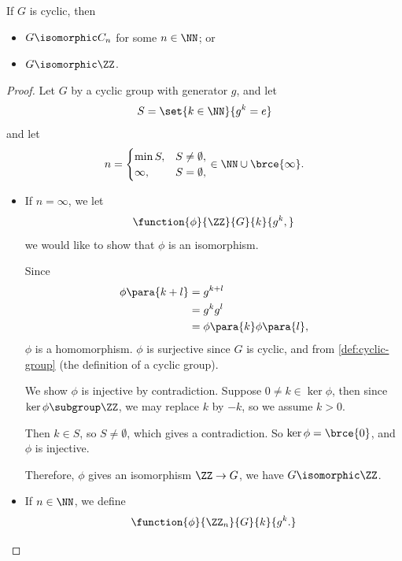 \begin{theorem}
    \label{thm:classification-cyclic-groups}%
    If \(G\) is cyclic, then
    \begin{itemize}
        \item \(G \isomorphic C_n\) for some \(n \in \NN\); or
        \item \(G \isomorphic \ZZ\).
    \end{itemize}
\end{theorem}

\begin{proof}
    Let \(G\) by a cyclic group with generator \(g\), and let
    \[
        S = \set{k \in \NN}{g^k = e}
    \]
    and let
    \[
        n = \begin{cases}
            \min S, & S \neq \emptyset, \\
            \infty, & S = \emptyset,
        \end{cases}
        \in \NN \cup \brce{\infty}.
    \]

    \begin{itemize}
        \item If \(n = \infty\), we let
        \[
            \function{\phi}{\ZZ}{G}{k}{g^k,}
        \]
        we would like to show that \(\phi\) is an isomorphism.

        Since
        \begin{align*}
            \phi \para{k + l} &= g^{k + l} \\
            &= g^k g^l \\
            &= \phi \para{k} \phi \para{l},
        \end{align*}
        \(\phi\) is a homomorphism. \(\phi\) is surjective since \(G\) is cyclic, and from \autoref{def:cyclic-group} (the definition of a cyclic group).

        We show \(\phi\) is injective by contradiction. Suppose \(0 \neq k \in \ker \phi\), then since \(\ker \phi \subgroup \ZZ\), we may replace \(k\) by \(-k\), so we assume \(k > 0\).

        Then \(k \in S\), so \(S \neq \emptyset\), which gives a contradiction. So \(\ker \phi = \brce{0}\), and \(\phi\) is injective.

        Therefore, \(\phi\) gives an isomorphism \(\ZZ \to G\), we have \(G \isomorphic \ZZ\).

        \item If \(n \in \NN\), we define
        \[
            \function{\phi}{\ZZ_n}{G}{k}{g^k.}
        \]


\end{itemize}
\end{proof}
